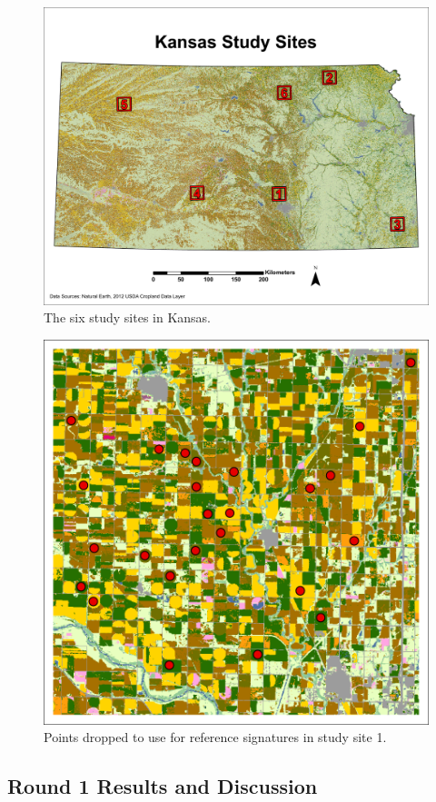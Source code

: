 \begin{figure}
  \centering
  \includegraphics[width=.9\textwidth]{Graphics/Testing/STUDYSITES.pdf}
  \caption{The six study sites in Kansas.}
  \label{fig:studysites}
\end{figure}

\begin{figure}
  \centering
  \includegraphics[width=.7\textwidth]{Graphics/Testing/clip1_30mCDL_smpl_old.pdf}
  \caption{Points dropped to use for reference signatures in study site 1.}
  \label{fig:refpoints}
\end{figure}

\subsection*{Round 1 Results and Discussion}


